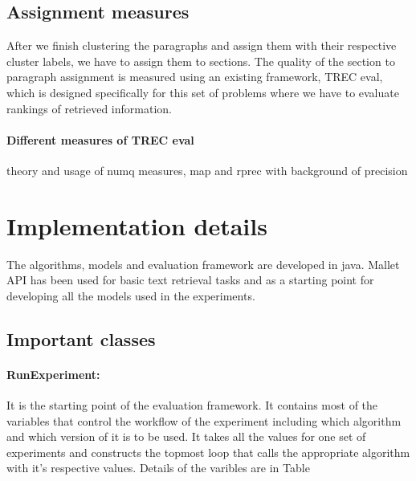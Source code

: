 \subsection{Assignment measures}
\label{sec:6}
After we finish clustering the paragraphs and assign them with their respective cluster labels, we have to assign them to sections. The quality of the section to paragraph assignment is measured using an existing framework, TREC eval, which is designed specifically for this set of problems where we have to evaluate rankings of retrieved information.
\paragraph{Different measures of TREC eval} theory and usage of numq measures, map and rprec with background of precision

\section{Implementation details}
\label{sec:implementation}
The algorithms, models and evaluation framework are developed in java. Mallet API has been used for basic text retrieval tasks and as a starting point for developing all the models used in the experiments.
\subsection{Important classes}
\paragraph{RunExperiment: }
It is the starting point of the evaluation framework. It contains most of the variables that control the workflow of the experiment including which algorithm and which version of it is to be used. It takes all the values for one set of experiments and constructs the topmost loop that calls the appropriate algorithm with it's respective values. Details of the varibles are in Table

